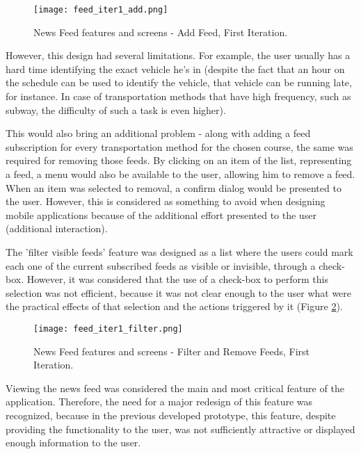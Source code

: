 \begin{figure}[htb]
  \begin{center}
    \leavevmode
    \texttt{[image: feed\_iter1\_add.png]}
    \caption{News Feed features and screens - Add Feed, First Iteration.}
    \label{fig:feed_iter1_add}
  \end{center}
\end{figure}


However, this design had several limitations. For example, the user usually has a hard time identifying the exact vehicle he's in (despite the fact that an hour on the schedule can be used to identify the vehicle, that vehicle can be running late, for instance. In case of transportation methods that have high frequency, such as subway, the difficulty of such a task is even higher).


This would also bring an additional problem - along with adding a feed subscription for every transportation method for the chosen course, the same was required for removing those feeds.
By clicking on an item of the list, representing a feed, a menu would also be available to the user, allowing him to remove a feed. When an item was selected to removal, a confirm dialog would be presented to the user. However, this is considered as something to avoid when designing mobile applications because of the additional effort presented to the user (additional interaction).

The 'filter visible feeds' feature was designed as a list where the users could mark each one of the current subscribed feeds as visible or invisible, through a check-box. However, it was considered that the use of a check-box to perform this selection was not efficient, because it was not clear enough to the user what were the practical effects of that selection and the actions triggered by it (Figure \ref{fig:feed_iter1_filter}).

\begin{figure}[H]
  \begin{center}
    \leavevmode
    \texttt{[image: feed\_iter1\_filter.png]}
    \caption{News Feed features and screens - Filter and Remove Feeds, First Iteration.}
    \label{fig:feed_iter1_filter}
  \end{center}
\end{figure}


Viewing the news feed was considered the main and most critical feature of the application. Therefore, the need for a major redesign of this feature was recognized, because in the previous developed prototype, this feature, despite providing the functionality to the user, was not sufficiently attractive or displayed enough information to the user.

